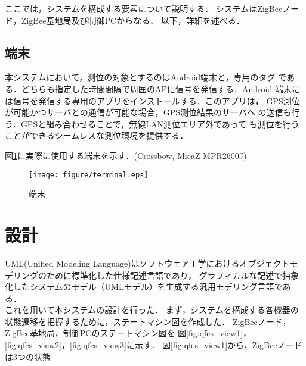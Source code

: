 \documentclass[12pt]{jreport}
\begin{document}
ここでは，システムを構成する要素について説明する．
システムはZigBeeノード，ZigBee基地局及び制御PCからなる．
以下，詳細を述べる．

\subsection{端末}

本システムにおいて，測位の対象とするのはAndroid端末と，専用のタグ
である．どちらも指定した時間間隔で周囲のAPに信号を発信する．Android
端末には信号を発信する専用のアプリをインストールする．このアプリは，
GPS測位が可能かつサーバとの通信が可能な場合，GPS測位結果のサーバへ
の送信も行う．GPSと組み合わせることで，無線LAN測位エリア外であって
も測位を行うことができるシームレスな測位環境を提供する．

図\ref{fig:terminal}に実際に使用する端末を示す．(Crossbow, MicaZ MPR2600J)

\begin{figure}[bt]
\begin{center}
\texttt{[image: figure/terminal.eps]}
\caption{端末}
\label{fig:terminal}
\end{center}
\end{figure}


\section{設計}
UML(Unified Modeling Language)はソフトウェア工学におけるオブジェクトモデリングのために標準化した仕様記述言語であり，
グラフィカルな記述で抽象化したシステムのモデル（UMLモデル）を生成する汎用モデリング言語である．\\
これを用いて本システムの設計を行った．
まず，システムを構成する各機器の状態遷移を把握するために，ステートマシン図を作成した．
ZigBeeノード，ZigBee基地局，制御PCのステートマシン図を
図\ref{fig:qfes_view1}，\ref{fig:qfes_view2}，\ref{fig:qfes_view3}に示す．
図\ref{fig:qfes_view1}から，ZigBeeノードは3つの状態
\end{document}

